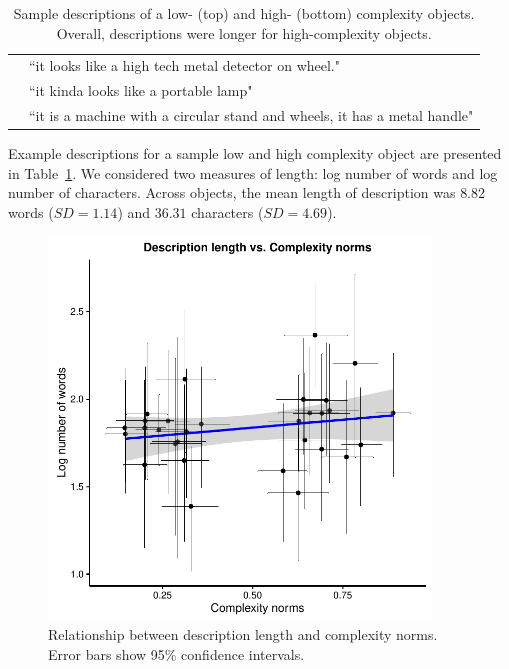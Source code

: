 \begin{table}[t!]
\begin{tabular}{ll}
                   & ``it looks like a high tech metal detector on wheel."                                   \\
                   & ``it kinda looks like a portable lamp"                                \\  
                   & ``it is a machine with a circular stand and wheels, it has a metal handle"\\
   \bottomrule
\end{tabular}
\caption{Sample descriptions of a low- (top) and high- (bottom)  complexity objects.  Overall, descriptions were longer for high-complexity objects.}
\label{tab:sample_obj_descriptions}
\end{table}


Example descriptions for a sample low and high complexity object are presented in Table~\ref{tab:sample_obj_descriptions}. We considered two measures of length:  log number of words and log number of characters. Across objects, the mean length of description was  $8.82$ words ($SD = 1.14$) and $36.31$ characters ($SD = 4.69$).

 \begin{figure}[t!]
 \begin{center}
  \includegraphics[width=4in]{figs/desc_length_word.pdf}
  \caption{\label{fig:desc_length} Relationship between description length and complexity norms. Error bars show  95\% confidence intervals.}
 \end{center}
\end{figure}


